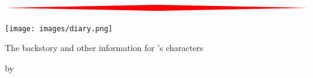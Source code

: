 
\begin{titlepage}
    \begin{onecolumn}
        \begin{center}
            {\Huge \booktitle}
            
            \vspace{0.5cm}
            \includegraphics[width=\textwidth]{images/hr.png}
            
            \vspace{0.5cm}
            {\huge \booksubtitle}
            
            \vspace{0.5cm}

            \texttt{[image: images/diary.png]}
            
            \vspace{0.5cm}
            
            \vspace{0.5cm}
            {\Large The backstory and other information for \bookauthor{}'s characters}

            
            \vfill
            {\Large by \bookauthor}
            
        \end{center}
    \end{onecolumn}
\end{titlepage}
\clearpage

\setcounter{tocdepth}{2} %
\tableofcontents
\vfill
\clearpage